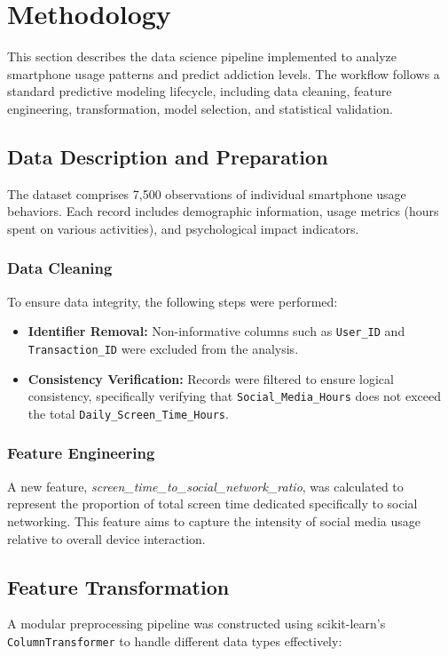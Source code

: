 \section{Methodology}
\label{sec:methodology}

This section describes the data science pipeline implemented to analyze smartphone usage patterns and predict addiction levels. The workflow follows a standard predictive modeling lifecycle, including data cleaning, feature engineering, transformation, model selection, and statistical validation.

\subsection{Data Description and Preparation}
The dataset comprises 7,500 observations of individual smartphone usage behaviors. Each record includes demographic information, usage metrics (hours spent on various activities), and psychological impact indicators.

\subsubsection{Data Cleaning}
To ensure data integrity, the following steps were performed:
\begin{itemize}
    \item \textbf{Identifier Removal:} Non-informative columns such as \texttt{User\_ID} and \texttt{Transaction\_ID} were excluded from the analysis.
    \item \textbf{Consistency Verification:} Records were filtered to ensure logical consistency, specifically verifying that \texttt{Social\_Media\_Hours} does not exceed the total \texttt{Daily\_Screen\_Time\_Hours}.
\end{itemize}

\subsubsection{Feature Engineering}
A new feature, \textit{screen\_time\_to\_social\_network\_ratio}, was calculated to represent the proportion of total screen time dedicated specifically to social networking. This feature aims to capture the intensity of social media usage relative to overall device interaction.

\subsection{Feature Transformation}
A modular preprocessing pipeline was constructed using scikit-learn's \texttt{ColumnTransformer} to handle different data types effectively:

